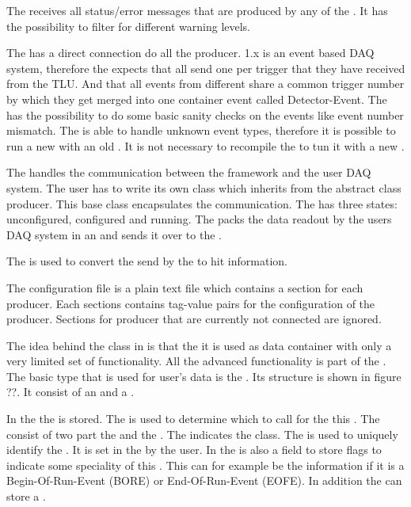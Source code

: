 The \logcollector receives all status/error messages that are produced by any of the \producer. 
It has the possibility to filter for different warning levels. 

The \dc has a direct connection do all the producer. 
\eudaq 1.x is an event based DAQ system, therefore the \dc expects that all \producer send one \event per trigger that they have received from the TLU. 
And that all events from different \producer share a common trigger number by which they get merged into one container event called Detector-Event. 
The \dc has the possibility to do some basic sanity checks on the events like event number mismatch. 
The \dc is able to handle unknown event types, therefore it is possible to run a new \producer with an old \dc. It is not necessary to recompile the \dc to tun it with a new \producer. 

The \producer handles the communication between the \eudaq framework and the user DAQ system. 
The user has to write its own \producer class which inherits from the abstract class producer. 
This base class encapsulates the \tcp communication. The \producer has three states: unconfigured, configured and running. 
The \producer packs the data readout by the users DAQ system in an \eudaq \event and sends it over \tcp to the \dc. 

The \dataconverterplugin is used to convert the \rawdata send by the \producer to hit information. 


The configuration file is a plain text file which contains a section for each producer. 
Each sections contains tag-value pairs for the configuration of the producer. 
Sections for producer that are currently not connected are ignored. 

The idea behind the \event class in \eudaq is that the it is used as data container with only a very limited set of functionality. 
All the advanced functionality is part of the \dataconverterplugin. 
The basic \event type that is used for user's data is the \rawdataevent. 
Its structure is shown in figure ??. It consist of an \eventheader and a \datablock. 

In the \eventheader the \eventtype is stored. 
The \eventtype is used to determine which \dataconverterplugin to call for the this \event. 
The \eventtype consist of two part the \eventid and the \subeventtype. 
The \eventid indicates the \cpp class. 
The \subeventtype is used to uniquely identify the \event. 
It is set in the \producer by the user. 
In the \eventheader is also a field to store flags to indicate some speciality of this \event. 
This can for example be the information if it is a Begin-Of-Run-Event (BORE) or End-Of-Run-Event (EOFE). 
In addition the \eventheader can store a \timestamp. 
 
